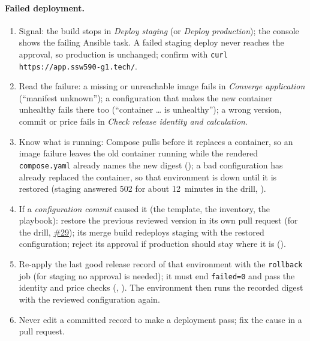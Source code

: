 \paragraph{Failed deployment.}
\begin{enumerate}
\item Signal: the build stops in \emph{Deploy staging} (or \emph{Deploy production}); the console shows the failing Ansible task. A failed staging deploy never reaches the approval, so production is unchanged; confirm with \texttt{curl https://app.ssw590-g1.tech/}.
\item Read the failure: a missing or unreachable image fails in \emph{Converge application} (``manifest unknown''); a configuration that makes the new container unhealthy fails there too (``container \ldots{} is unhealthy''); a wrong version, commit or price fails in \emph{Check release identity and calculation}.
\item Know what is running: Compose pulls before it replaces a container, so an image failure leaves the old container running while the rendered \texttt{compose.yaml} already names the new digest (); a bad configuration has already replaced the container, so that environment is down until it is restored (staging answered 502 for about 12~minutes in the drill, ).
\item If a \emph{configuration commit} caused it (the template, the inventory, the playbook): restore the previous reviewed version in its own pull request (for the drill, \href{\GiteaRepoURL/pulls/29}{\#29}); its merge build redeploys staging with the restored configuration; reject its approval if production should stay where it is ().
\item Re-apply the last good release record of that environment with the \texttt{rollback} job (for staging no approval is needed); it must end \texttt{failed=0} and pass the identity and price checks (, ). The environment then runs the recorded digest with the reviewed configuration again.
\item Never edit a committed record to make a deployment pass; fix the cause in a pull request.
\end{enumerate}

